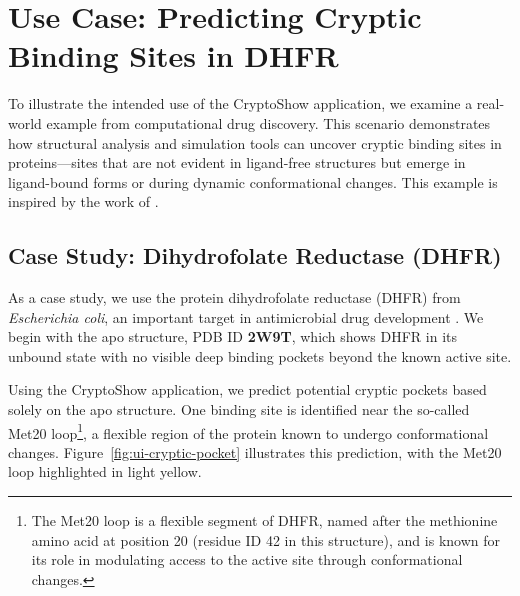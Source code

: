 \section{Use Case: Predicting Cryptic Binding Sites in DHFR}
\label{sec:use-case}

To illustrate the intended use of the CryptoShow application, we examine a real-world example from computational drug discovery. This scenario demonstrates how structural analysis and simulation tools can uncover cryptic binding sites in proteins—sites that are not evident in ligand-free structures but emerge in ligand-bound forms or during dynamic conformational changes. This example is inspired by the work of \citet{meller2023predicting}.

\subsection{Case Study: Dihydrofolate Reductase (DHFR)}
\label{subsec:dhfr-example}

As a case study, we use the protein dihydrofolate reductase (DHFR) from \textit{Escherichia coli}, an important target in antimicrobial drug development \cite{heaslet2009structural}. We begin with the apo structure, PDB ID \textbf{2W9T}, which shows DHFR in its unbound state with no visible deep binding pockets beyond the known active site.

Using the CryptoShow application, we predict potential cryptic pockets based solely on the apo structure. One binding site is identified near the so-called Met20 loop\footnote{The Met20 loop is a flexible segment of DHFR, named after the methionine amino acid at position 20 (residue ID 42 in this structure), and is known for its role in modulating access to the active site through conformational changes.}, a flexible region of the protein known to undergo conformational changes. Figure~\ref{fig:ui-cryptic-pocket} illustrates this prediction, with the Met20 loop highlighted in light yellow.

